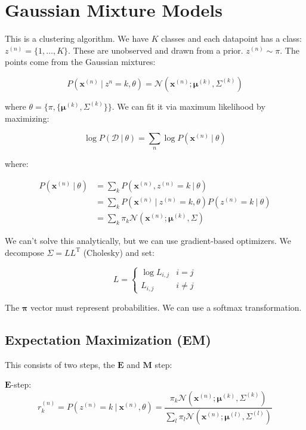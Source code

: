 \documentclass{article}
\newcommand{\bm}[1]{\mathbf{#1}}
\newcommand{\vf}[1]{\mathbf{#1}}
\newcommand{\normal}{\mathcal{N}}
\newcommand{\bx}{\vf{x}}
\newcommand{\giv}{\ |\ }
\newcommand{\bmu}{\pmb{\mu}}
\newcommand{\data}{\mathcal{D}}
\newcommand{\tran}{\text{T}}
\begin{document}
\section{Gaussian Mixture Models}
This is a clustering algorithm. We have $K$ classes and each datapoint has a class: $z^{(n)} = \{1, \dots, K\}$. These are unobserved and drawn from a prior. $z^{(n)} \sim \pi$. The points come from the Gaussian mixtures:

\begin{equation*}
    P(\bx^{(n)} \giv z^{n} = k, \theta) = \normal(\bx^{(n)}; \pmb{\mu}^{(k)}, \Sigma^{(k)})
\end{equation*}

where $\theta = \{ \pi, \{ \bmu^{(k)}, \Sigma^{(k)} \}\}$. We can fit it via maximum likelihood by maximizing:

\begin{equation*}
    \log P(\data \giv \theta) = \sum_n \log P(\bx^{(n)} \giv \theta)
\end{equation*}

where:

\begin{align*}
    P(\bx^{(n)} \giv \theta) &=
        \sum_k P(\bx^{(n)}, z^{(n)} = k \giv \theta) \\
    &= \sum_k P(\bx^{(n)} \giv z^{(n)} = k, \theta) P(z^{(n)} = k \giv \theta) \\
    &= \sum_k \pi_k \normal(\bx^{(n)}; \bmu^{(k)}, \Sigma)
\end{align*}

We can't solve this analytically, but we can use gradient-based optimizers. We decompose $\Sigma = LL^\tran$ (Cholesky) and set:

\begin{equation*}
    L = \begin{cases}
        \log L_{i, j} & i = j \\
        L_{i, j}      & i \neq j
    \end{cases}
\end{equation*}

The $\pmb{\pi}$ vector must represent probabilities. We can use a softmax transformation.

\subsection{Expectation Maximization (EM)}
This consists of two steps, the $\bm{E}$ and $\bm{M}$ step:
\vskip 0.1in

$\bm{E}$-step:
\begin{equation}
    r_k^{(n)} = P(z^{(n)} = k \giv \bx^{(n)}, \theta) = \frac{
        \pi_k \normal(\bx^{(n)}; \bmu^{(k)}, \Sigma^{(k)})
    }{
        \sum_l \pi_l \normal(\bx^{(n)}; \bmu^{(l)}, \Sigma^{(l)})
    }
\end{equation}
\end{document}
